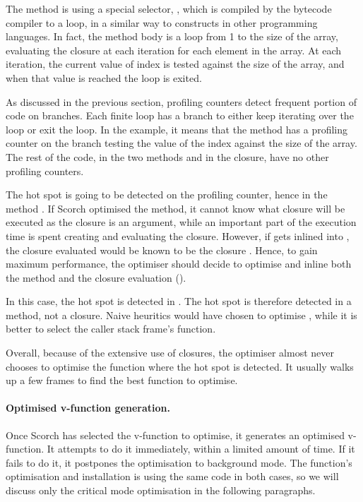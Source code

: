 \documentclass[a4paper,12pt,twoside]{../includes/ThesisStyle}
\begin{document}
The method  is using a special selector, , which is compiled by the bytecode compiler to a loop, in a similar way to  constructs in other programming languages. In fact, the  method body is a loop from 1 to the size of the array, evaluating the closure at each iteration for each element in the array. At each iteration, the current value of index is tested against the size of the array, and when that value is reached the loop is exited.

As discussed in the previous section, profiling counters detect frequent portion of code on branches. Each finite loop has a branch to either keep iterating over the loop or exit the loop. In the example, it means that the method  has a profiling counter on the branch testing the value of the index against the size of the array. The rest of the code, in the two methods and in the closure, have no other profiling counters.

The hot spot is going to be detected on the profiling counter, hence in the method . If Scorch optimised the  method, it cannot know what closure will be executed as the closure is an argument, while an important part of the execution time is spent creating and evaluating the closure. However, if  gets inlined into , the closure evaluated would be known to be the closure . Hence, to gain maximum performance, the optimiser should decide to optimise  and inline both the  method and the closure evaluation (). 

In this case, the hot spot is detected in . The hot spot is therefore detected in a method, not a closure. Naive heuritics would have chosen to optimise , while it is better to select the caller stack frame's function.

Overall, because of the extensive use of closures, the optimiser almost never chooses to optimise the function where the hot spot is detected. It usually walks up a few frames to find the best function to optimise. 

\paragraph{Optimised v-function generation.}
Once Scorch has selected the v-function to optimise, it generates an optimised v-function. It attempts to do it immediately, within a limited amount of time. If it fails to do it, it postpones the optimisation to background mode. The function's optimisation and installation is using the same code in both cases, so we will discuss only the critical mode optimisation in the following paragraphs.
\end{document}

